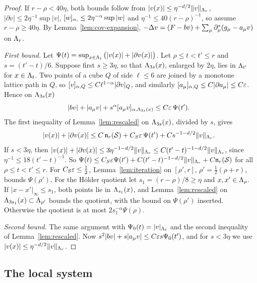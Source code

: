 \begin{proof}
If $r-\rho<40\eta$, both bounds follow from $|v(x)|\le\eta^{-d/2}\|v\|_{\Lambda_r}$, $|\partial v|\le2\eta^{-1}\sup|v|$, $[w]_{\alpha,}\le2\eta^{-\alpha}\sup|w|$ and $\eta^{-1}\le40(r-\rho)^{-1}$, so assume $r-\rho\ge40\eta$. By Lemma~\ref{lem:cov-expansion}, $-\Delta v=(F-bv)+\sum_\mu\partial^*_\mu(g_\mu-a_\mu v)$ on $\Lambda_r$.

\emph{First bound.} Let $\Psi(t)=\sup_{x\in\Lambda_t}\big(|v(x)|+|\partial v(x)|\big)$. Let $\rho\le t<t'\le r$ and $s=(t'-t)/6$. Suppose first $s\ge3\eta$, so that $\Lambda_{3s}(x)$, enlarged by $2\eta$, lies in $\Lambda_{t'}$ for $x\in\Lambda_t$. Two points of a cube $Q$ of side $\ell\le6$ are joined by a monotone lattice path in $Q$, so $[v]_{\alpha,Q}\le C\ell^{1-\alpha}|\partial v|_Q$, and similarly $[a_\mu]_{\alpha,Q}\le C|\partial a_\mu|\le C\varepsilon$. Hence on $\Lambda_{3s}(x)$
\[
|bv|+|a_\mu v|+s^\alpha[a_\mu v]_{\alpha,\Lambda_{3s}(x)}\le C\varepsilon\,\Psi(t').
\]
The first inequality of Lemma~\ref{lem:rescaled} on $\Lambda_{3s}(x)$, divided by $s$, gives
\[
|v(x)|+|\partial v(x)|\le C\,\mathfrak n_r(\mathcal S)+C_S\varepsilon\,\Psi(t')+Cs^{-1-d/2}\|v\|_{\Lambda_r}.
\]
If $s<3\eta$, then $|v(x)|+|\partial v(x)|\le3\eta^{-1-d/2}\|v\|_{\Lambda_r}\le C(t'-t)^{-1-d/2}\|v\|_{\Lambda_r}$, since $\eta^{-1}\le18(t'-t)^{-1}$. So $\Psi(t)\le C_S\varepsilon\Psi(t')+C(t'-t)^{-1-d/2}\|v\|_{\Lambda_r}+C\mathfrak n_r(\mathcal S)$ for all $\rho\le t<t'\le r$. For $C_S\varepsilon\le\frac12$, Lemma~\ref{lem:iteration} on $[\rho',r]$, $\rho'=\frac12(\rho+r)$, bounds $\Psi(\rho')$. For the H\"older quotient let $s_1=(r-\rho)/8\ge\eta$ and $x,x'\in\Lambda_\rho$. If $|x-x'|_\infty\le s_1$, both points lie in $\Lambda_{s_1}(x)$, and Lemma~\ref{lem:rescaled} on $\Lambda_{3s_1}(x)\subset\Lambda_{\rho'}$ bounds the quotient, with the bound on $\Psi(\rho')$ inserted. Otherwise the quotient is at most $2s_1^{-\alpha}\Psi(\rho)$.

\emph{Second bound.} The same argument with $\Psi_0(t)=|v|_{\Lambda_t}$ and the second inequality of Lemma~\ref{lem:rescaled}. Now $s^2|bv|+s|a_\mu v|\le C\varepsilon s\Psi_0(t')$, and for $s<3\eta$ we use $|v(x)|\le\eta^{-d/2}\|v\|_{\Lambda_r}$.
\end{proof}

\subsection{The local system}\label{ss:36.2}


